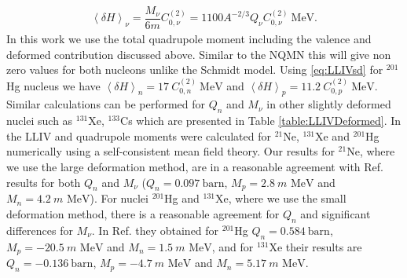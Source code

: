 \documentclass[8pt,a4paper, twoside]{report}
\begin{document}
\begin{align} \label{eq:LLIVsd}
\left<\delta H\right>_{\nu} = \dfrac{M_\nu}{6m} C_{0, \nu}^{(2)} = 1100A^{-2/3}Q_{\nu} C_{0, \nu}^{(2)} \ \text{MeV}.
\end{align}
In this work we use the total quadrupole moment including the valence and deformed contribution discussed above. Similar to the NQMN this will give non zero values for both nucleons unlike the Schmidt model. Using \ref{eq:LLIVsd} for $^{201}$Hg nucleus we have $\left<\delta H\right>_{n} = 17 \ C_{0, n}^{(2)} \ \text{MeV}$ and $\left<\delta H\right>_{p} = 11.2 \ C_{0, p}^{(2)} \ \text{MeV}$. Similar calculations can be performed for $Q_n$ and $M_{\nu}$ in other slightly deformed nuclei such as $^{131}$Xe, $^{133}$Cs which are presented in Table \ref{table:LLIVDeformed}. In \cite{Brown2016} the LLIV and quadrupole moments were calculated for $^{21}$Ne, $^{131}$Xe and $^{201}$Hg numerically using a self-consistent mean field theory. 
Our results for $^{21}$Ne, where we  use the large deformation method, are in a reasonable agreement  with Ref.  \cite{Brown2016} results for both $Q_{n}$ and $M_{\nu}$ ($Q_n = 0.097 \ \text{barn}$, $M_{p} = 2.8 \ m\text{ MeV}$ and $M_n = 4.2 \ m\text{ MeV}$). For nuclei  $^{201}$Hg  and $^{131}$Xe, where we use the small deformation method, there is a reasonable agreement for $Q_n$ and significant differences for $M_{\nu}$. In Ref.  \cite{Brown2016}  they obtained for $^{201}$Hg  $Q_n = 0.584 \ \text{barn}$, $M_{p} = -20.5 \ m\text{ MeV}$ and $M_n = 1.5 \ m\text{ MeV}$,  and for $^{131}$Xe their results are $Q_n = -0.136 \ \text{barn}$, $M_{p} = -4.7 \ m\text{ MeV}$ and $M_n = 5.17 \ m\text{ MeV}$.
\end{document}
